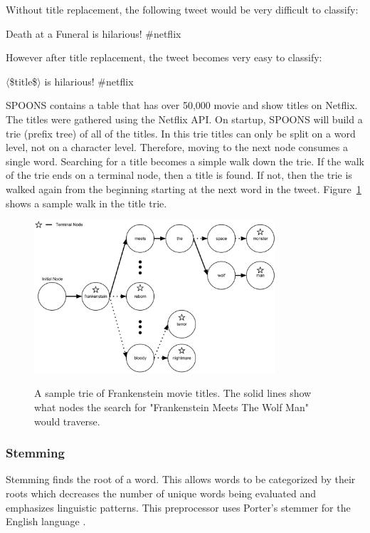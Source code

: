 \documentclass[12pt]{ucthesis}
\newcommand{\captionfonts}{\small\bf\ssp}
\begin{document}
Without title replacement, the following tweet would be very difficult to classify:

\begin{center}
Death at a Funeral is hilarious!  \#netflix
\end{center}

However after title replacement, the tweet becomes very easy to classify:

\begin{center}
$\langle$\$title\$$\rangle$ is hilarious!  \#netflix
\end{center}

SPOONS contains a table that has over 50,000 movie and show titles on Netflix. The titles were gathered
using the Netflix API. On startup, SPOONS will build a trie (prefix tree)\cite{trie} of all of the titles. In this trie titles can
only be split on a word level, not on a character level. Therefore, moving to the next node consumes a single word.
Searching for a title becomes a simple walk down the trie.
If the walk of the trie ends on a terminal node, then a title is found. If not, then the trie is walked again from the beginning
starting at the next word in the tweet. Figure~\ref{fig:title-trie} shows a sample walk in the title trie.

\begin{figure}
   \begin{center}
      \includegraphics[width=0.8\textwidth]{images/Title_Trie.eps}
      \captionfonts
      \caption[Title Trie Walk]{A sample trie of Frankenstein movie titles. The solid lines show what nodes the search for "Frankenstein Meets The Wolf Man" would traverse.}
      \label{fig:title-trie}
   \end{center}
\end{figure}

\subsubsection{Stemming}
\label{class-filter-stemming}
Stemming finds the root of a word. This allows words to be categorized by their roots which
decreases the number of unique words being evaluated and emphasizes linguistic patterns.
This preprocessor uses Porter's stemmer for the English language \cite{porters}.
\end{document}
